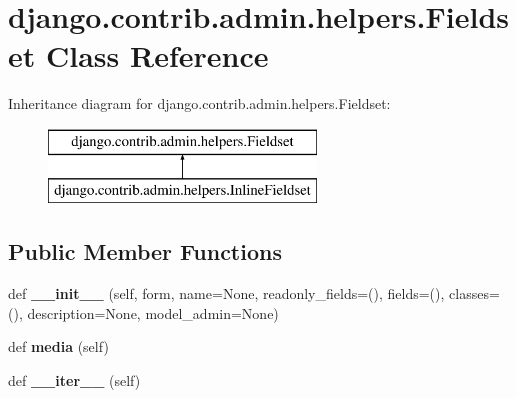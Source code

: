 \hypertarget{classdjango_1_1contrib_1_1admin_1_1helpers_1_1_fieldset}{}\section{django.\+contrib.\+admin.\+helpers.\+Fieldset Class Reference}
\label{classdjango_1_1contrib_1_1admin_1_1helpers_1_1_fieldset}
Inheritance diagram for django.\+contrib.\+admin.\+helpers.\+Fieldset\+:\begin{figure}[H]
\begin{center}
\leavevmode
\includegraphics[height=2.000000cm]{classdjango_1_1contrib_1_1admin_1_1helpers_1_1_fieldset}
\end{center}
\end{figure}
\subsection*{Public Member Functions}
\begin{DoxyCompactItemize}
\item 
\mbox{\label{classdjango_1_1contrib_1_1admin_1_1helpers_1_1_fieldset_a070a074ab4a55c8625c4cc3a7f57f01b}} 
def {\bfseries \+\_\+\+\_\+init\+\_\+\+\_\+} (self, form, name=None, readonly\+\_\+fields=(), fields=(), classes=(), description=None, model\+\_\+admin=None)
\item 
\mbox{\label{classdjango_1_1contrib_1_1admin_1_1helpers_1_1_fieldset_a635f1cb4a2566f6e17888278cabcbc02}} 
def {\bfseries media} (self)
\item 
\mbox{\label{classdjango_1_1contrib_1_1admin_1_1helpers_1_1_fieldset_a0b6d116b51c4a6c6590e511104120e8b}} 
def {\bfseries \+\_\+\+\_\+iter\+\_\+\+\_\+} (self)
\end{DoxyCompactItemize}
